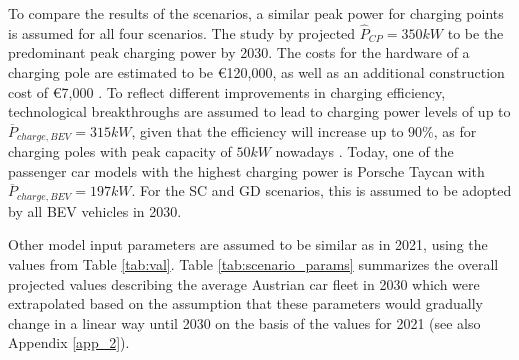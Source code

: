 \documentclass[journal,article,submit,pdftex,moreauthors]{Definitions/mdpi}
\begin{document}
    To compare the results of the scenarios, a similar peak power for charging points is assumed for all four scenarios. The study by \citet{IRENA2019} projected $\hat{P}_{CP} = 350kW $ to be the predominant peak charging power by 2030. The costs for the hardware of a charging pole are estimated to be €120,000, as well as an additional construction cost of €7,000 \citep{Suomalainen2019, Baumgarte2021}. To reflect different improvements in charging efficiency, technological breakthroughs are assumed to lead to charging power levels of up to $\overline{P}_{charge, BEV} = 315kW$, given that the efficiency will increase up to $90 \%$, as for charging poles with peak capacity of $50kW$ nowadays \citep{Genovese2015}. Today, one of the passenger car models with the highest charging power is Porsche Taycan with $\overline{P}_{charge, BEV} = 197 kW$. For the SC and GD scenarios, this is assumed to be adopted by all BEV vehicles in 2030.  
    
    Other model input parameters are assumed to be similar as in 2021, using the values from Table \ref{tab:val}. Table \ref{tab:scenario_params} summarizes the overall projected values describing the average Austrian car fleet in 2030 which were extrapolated based on the assumption that these parameters would gradually change in a linear way until 2030 on the basis of the values for 2021 (see also Appendix \ref{app_2}). 
    
\end{document}
